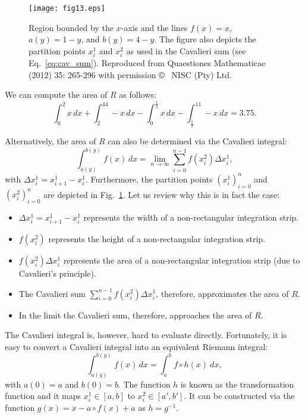 \documentclass{article}
\theoremstyle{theorem}
\theoremstyle{definition}
\begin{document}
\begin{figure}[htb]
\centering
\texttt{[image: fig13.eps]}
\caption{Region bounded by the $x$-axis and the lines $f(x)=x$, $a(y)=1-y$, and $b(y)=4-y$. The figure also depicts the partition points $x_i^1$ and $x_i^2$ as used in the Cavalieri sum (see Eq.~\eqref{eq:cav_sum}). Reproduced from Quaestiones Mathematicae (2012) 35: 265-296 with permission \copyright~ NISC (Pty) Ltd.}
\label{fig:caval2}
\end{figure}

\noindent
We can compute the area of $R$ as follows:
\begin{equation}
\int_0^2x\, dx+\int_2^44-x\, dx- \int_0^{\frac{1}{2}}x\, dx-\int_{\frac{1}{2}}^11-x\, dx = 3.75. 
\end{equation}

\noindent
Alternatively, the area of $R$ can also be determined via the Cavalieri integral:
\begin{equation}
\label{eq:caval1}
\int_{a(y)}^{b(y)}f(x)\, dx = \lim_{n\to \infty}\sum_{i=0}^{n-1} f(x_i^2)\Delta x_i^1,
\end{equation}
with $\Delta x_i^1 = x_{i+1}^1 - x_i^1$. Furthermore, the partition points $(x_i^1)_{i=0}^{n}$ and $(x_i^2)_{i=0}^{n}$ are depicted in Fig.~\ref{fig:caval2}. Let us review why this is in fact the case:
\begin{itemize}
 \item $\Delta x_i^1 = x_{i+1}^1 - x_i^1$ represents the width of a non-rectangular integration strip.
 \item $f(x_i^2)$ represents the height of a non-rectangular integration strip.
 \item $f(x_i^2)\Delta x_i^1$ represents the area of a non-rectangular integration strip (due to Cavalieri's principle).
 \item The Cavalieri sum $\sum_{i=0}^{n-1} f(x_i^2)\Delta x_i^1$, therefore, approximates the area of $R$.
 \item In the limit the Cavalieri sum, therefore, approaches the area of $R$.
\end{itemize}

\noindent
The Cavalieri integral is, however, hard to evaluate directly. Fortunately, it is easy to convert a Cavalieri integral into an equivalent Riemann integral:
\begin{equation}
\int_{a(y)}^{b(y)}f(x)\, dx = \int_{a}^{b} f\circ h(x)~dx, 
\end{equation}
with $a(0) = a$ and $b(0)=b$. The function $h$ is known as the transformation function and it maps $x_i^1\in[a,b]$ to $x_i^2\in[a',b']$. It can be constructed via the function $g(x) = x - a\circ f(x) + a$ as 
$h=g^{-1}$.
\end{document}
